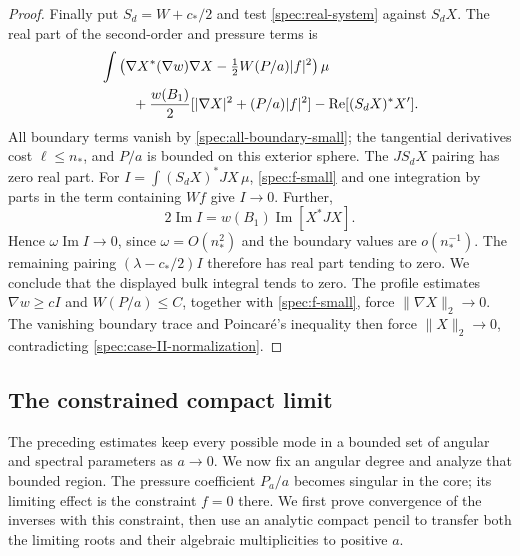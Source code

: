 \documentclass[11pt]{article}
\numberwithin{equation}{section}
\theoremstyle{definition}
\theoremstyle{remark}
\begin{document}
\begin{proof}
Finally put $S_d=W+c_*/2$ and test \eqref{spec:real-system} against
$S_dX$. The real part of the second-order and pressure terms is
\begin{align*}
 &\int\left(\nabla X^*(\nabla w)\nabla X
       -\tfrac12W(P/a)|f|^2\right)\mu\\
 &\hspace{8mm}
 +\frac{w(B_1)}2[|\nabla X|^2+(P/a)|f|^2]
 -\operatorname{Re}[(S_dX)^*X'].
\end{align*}
All boundary terms vanish by \eqref{spec:all-boundary-small}; the
tangential derivatives cost $\ell\le n_*$, and $P/a$ is bounded on
this exterior sphere. The $JS_dX$ pairing has zero real part. For
$I=\int(S_dX)^*JX\,\mu$, \eqref{spec:f-small} and one integration
by parts in the term containing $Wf$ give $I\to0$. Further,
\[
 2\operatorname{Im}I=w(B_1)\operatorname{Im}[X^*JX].
\]
Hence $\omega\operatorname{Im}I\to0$, since
$\omega=O(n_*^2)$ and the boundary values are $o(n_*^{-1})$.
The remaining pairing $(\lambda-c_*/2)I$ therefore has real part
tending to zero. We conclude that the displayed bulk integral tends
to zero. The profile estimates $\nabla w\ge cI$ and $W(P/a)\le C$,
together with \eqref{spec:f-small}, force $\|\nabla X\|_2\to0$.
The vanishing boundary trace and Poincar\'e's inequality then force
$\|X\|_2\to0$, contradicting \eqref{spec:case-II-normalization}.
\end{proof}

\subsection{The constrained compact limit}

The preceding estimates keep every possible mode in a bounded set of
angular and spectral parameters as $a\to0$. We now fix an angular degree
and analyze that bounded region. The pressure coefficient $P_a/a$ becomes
singular in the core; its limiting effect is the constraint $f=0$ there.
We first prove convergence of the inverses with this constraint, then
use an analytic compact pencil to transfer both the limiting roots and
their algebraic multiplicities to positive $a$.
\end{document}
